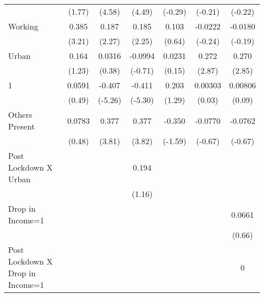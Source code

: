 \begin{table*}[htbp]
\begin{tabular}{l*{6}{c}}
                    &      (1.77)         &      (4.58)         &      (4.49)         &     (-0.29)         &     (-0.21)         &     (-0.22)         \\
[1em]
Working             &       0.385\sym{**} &       0.187\sym{*}  &       0.185\sym{*}  &       0.103         &     -0.0222         &     -0.0180         \\
                    &      (3.21)         &      (2.27)         &      (2.25)         &      (0.64)         &     (-0.24)         &     (-0.19)         \\
[1em]
Urban               &       0.164         &      0.0316         &     -0.0994         &      0.0231         &       0.272\sym{**} &       0.270\sym{**} \\
                    &      (1.23)         &      (0.38)         &     (-0.71)         &      (0.15)         &      (2.87)         &      (2.85)         \\
[1em]
1                   &      0.0591         &      -0.407\sym{***}&      -0.411\sym{***}&       0.203         &     0.00303         &     0.00806         \\
                    &      (0.49)         &     (-5.26)         &     (-5.30)         &      (1.29)         &      (0.03)         &      (0.09)         \\
[1em]
Others Present      &      0.0783         &       0.377\sym{***}&       0.377\sym{***}&      -0.350         &     -0.0770         &     -0.0762         \\
                    &      (0.48)         &      (3.81)         &      (3.82)         &     (-1.59)         &     (-0.67)         &     (-0.67)         \\
[1em]
Post Lockdown X Urban&                     &                     &       0.194         &                     &                     &                     \\
                    &                     &                     &      (1.16)         &                     &                     &                     \\
[1em]
Drop in Income=1    &                     &                     &                     &                     &                     &      0.0661         \\
                    &                     &                     &                     &                     &                     &      (0.66)         \\
[1em]
Post Lockdown X Drop in Income=1&                     &                     &                     &                     &                     &           0         \\

\end{tabular}
\end{table*}
